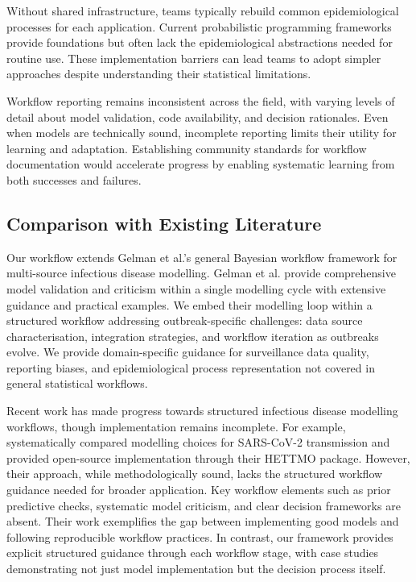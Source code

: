 \documentclass{article}
\begin{document}
\begin{enumerate}
Without shared infrastructure, teams typically rebuild common epidemiological processes for each application.
Current probabilistic programming frameworks provide foundations but often lack the epidemiological abstractions needed for routine use.
These implementation barriers can lead teams to adopt simpler approaches despite understanding their statistical limitations.

Workflow reporting remains inconsistent across the field, with varying levels of detail about model validation, code availability, and decision rationales.
Even when models are technically sound, incomplete reporting limits their utility for learning and adaptation.
Establishing community standards for workflow documentation would accelerate progress by enabling systematic learning from both successes and failures.

\subsection{Comparison with Existing Literature}

 Our workflow extends Gelman et al.'s general Bayesian workflow framework \citep{gelman2020bayesian} for multi-source infectious disease modelling.
 Gelman et al. provide comprehensive model validation and criticism within a single modelling cycle with extensive guidance and practical examples.
 We embed their modelling  loop within a structured workflow addressing outbreak-specific challenges: data source characterisation, integration strategies, and workflow iteration as outbreaks evolve. We provide domain-specific guidance for surveillance data quality, reporting biases, and epidemiological process representation not covered in general statistical workflows.
 
Recent work has made progress towards structured infectious disease modelling workflows, though implementation remains incomplete.
For example, \citet{bouman2024bayesian} systematically compared modelling choices for SARS-CoV-2 transmission and provided open-source implementation through their HETTMO package.
However, their approach, while methodologically sound, lacks the structured workflow guidance needed for broader application.
Key workflow elements such as prior predictive checks, systematic model criticism, and clear decision frameworks are absent.
Their work exemplifies the gap between implementing good models and following reproducible workflow practices.
In contrast, our framework provides explicit structured guidance through each workflow stage, with case studies demonstrating not just model implementation but the decision process itself.


\end{enumerate}
\end{document}
